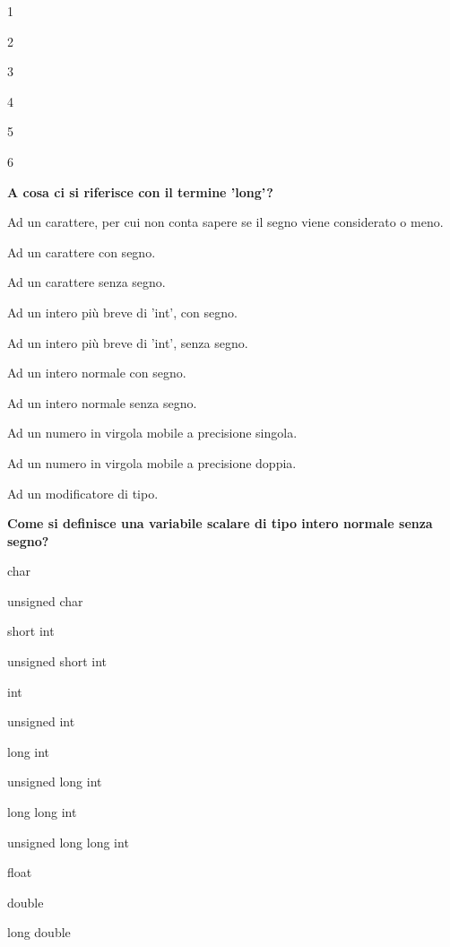 \documentclass[9pt]{article}
\begin{document}
\begin{enumerate}
\item[$\square$] 1
\item[$\square$] 2
\item[$\square$] 3
\item[$\square$] 4
\item[$\square$] 5
\item[$\square$] 6
\item [\nonumber]
\item{\bf A cosa ci si riferisce con il termine 'long'? %

\item[$\square$] Ad un carattere, per cui non conta sapere se il segno viene considerato o meno.
\item[$\square$] Ad un carattere con segno.
\item[$\square$] Ad un carattere senza segno.
\item[$\square$] Ad un intero pi\`{u} breve di 'int', con segno.
\item[$\square$] Ad un intero pi\`{u} breve di 'int', senza segno.
\item[$\square$] Ad un intero normale con segno.
\item[$\square$] Ad un intero normale senza segno.
\item[$\square$] Ad un numero in virgola mobile a precisione singola.
\item[$\square$] Ad un numero in virgola mobile a precisione doppia.
\item[$\square$] Ad un modificatore di tipo.
\item [\nonumber]
 \item {\bf Come si definisce una variabile scalare di tipo intero normale senza segno?}
 
\item[$\square$] char
\item[$\square$] unsigned char
\item[$\square$] short int
\item[$\square$] unsigned short int
\item[$\square$] int
\item[$\square$] unsigned int
\item[$\square$] long int
\item[$\square$] unsigned long int
\item[$\square$] long long int
\item[$\square$] unsigned long long int
\item[$\square$] float
\item[$\square$] double
\item[$\square$] long double
\item [\nonumber]

}
\end{enumerate}
\end{document}
